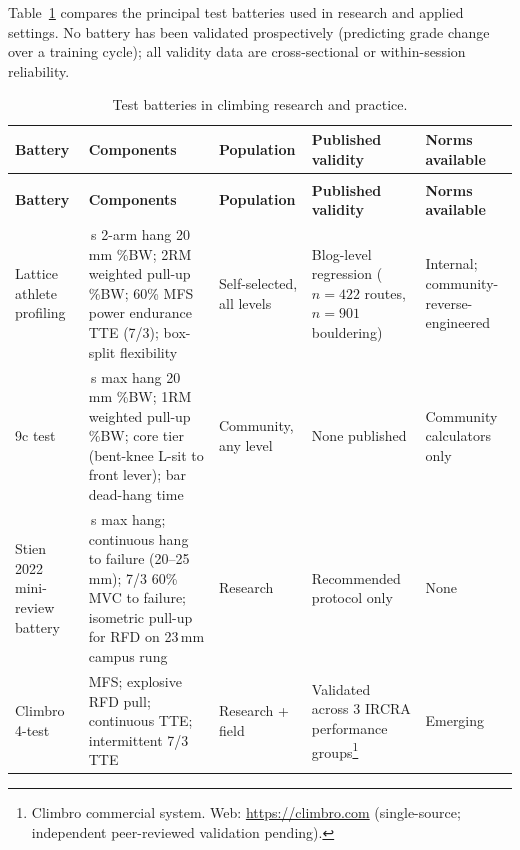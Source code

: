 Table~\ref{tab:batteries} compares the principal test batteries used in research and applied settings. No battery has been validated prospectively (predicting grade change over a training cycle); all validity data are cross-sectional or within-session reliability.

{\footnotesize
\setlength{\tabcolsep}{5pt}
\renewcommand{\arraystretch}{1.2}
\begin{longtable}{>{\raggedright\arraybackslash}p{2.8cm}
                  >{\raggedright\arraybackslash}p{3.8cm}
                  >{\raggedright\arraybackslash}p{2.2cm}
                  >{\raggedright\arraybackslash}p{2.5cm}
                  >{\raggedright\arraybackslash}p{2.5cm}}
\caption{Test batteries in climbing research and practice.}\label{tab:batteries}\\
\toprule
\textbf{Battery} & \textbf{Components} & \textbf{Population} & \textbf{Published validity} & \textbf{Norms available} \\
\midrule
\endfirsthead
\multicolumn{5}{c}{\textit{(continued)}}\\
\toprule
\textbf{Battery} & \textbf{Components} & \textbf{Population} & \textbf{Published validity} & \textbf{Norms available} \\
\midrule
\endhead
\bottomrule
\endlastfoot

Lattice athlete profiling & 7\,s 2-arm hang 20\,mm \%BW; 2RM weighted pull-up \%BW; 60\% MFS power endurance TTE (7/3); box-split flexibility & Self-selected, all levels & Blog-level regression ($n = 422$ routes, $n = 901$ bouldering) & Internal; community-reverse-engineered \\[3pt]

9c test & 5\,s max hang 20\,mm \%BW; 1RM weighted pull-up \%BW; core tier (bent-knee L-sit to front lever); bar dead-hang time & Community, any level & None published & Community calculators only \\[3pt]

Stien 2022 mini-review battery \cite{SSA22} & 7\,s max hang; continuous hang to failure (20--25\,mm); 7/3 60\% MVC to failure; isometric pull-up for RFD on 23\,mm campus rung & Research & Recommended protocol only & None \\[3pt]

Climbro 4-test & MFS; explosive RFD pull; continuous TTE; intermittent 7/3 TTE & Research + field & Validated across 3 IRCRA performance groups\footnote{Climbro commercial system. Web: \url{https://climbro.com} (single-source; independent peer-reviewed validation pending).} & Emerging \\[3pt]

\end{longtable}
}

